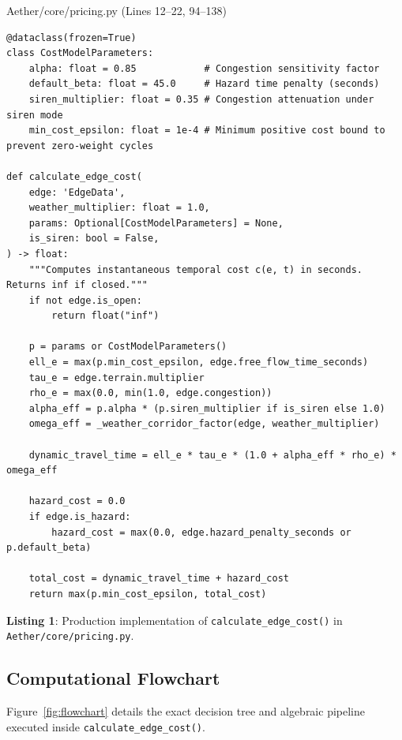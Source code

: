 \documentclass[10pt,a4paper]{article}
\begin{document}
\begin{codebox}{Aether/core/pricing.py (Lines 12--22, 94--138)}
\begin{lstlisting}[style=AetherPython]
@dataclass(frozen=True)
class CostModelParameters:
    alpha: float = 0.85            # Congestion sensitivity factor
    default_beta: float = 45.0     # Hazard time penalty (seconds)
    siren_multiplier: float = 0.35 # Congestion attenuation under siren mode
    min_cost_epsilon: float = 1e-4 # Minimum positive cost bound to prevent zero-weight cycles

def calculate_edge_cost(
    edge: 'EdgeData',
    weather_multiplier: float = 1.0,
    params: Optional[CostModelParameters] = None,
    is_siren: bool = False,
) -> float:
    """Computes instantaneous temporal cost c(e, t) in seconds. Returns inf if closed."""
    if not edge.is_open:
        return float("inf")

    p = params or CostModelParameters()
    ell_e = max(p.min_cost_epsilon, edge.free_flow_time_seconds)
    tau_e = edge.terrain.multiplier
    rho_e = max(0.0, min(1.0, edge.congestion))
    alpha_eff = p.alpha * (p.siren_multiplier if is_siren else 1.0)
    omega_eff = _weather_corridor_factor(edge, weather_multiplier)

    dynamic_travel_time = ell_e * tau_e * (1.0 + alpha_eff * rho_e) * omega_eff

    hazard_cost = 0.0
    if edge.is_hazard:
        hazard_cost = max(0.0, edge.hazard_penalty_seconds or p.default_beta)

    total_cost = dynamic_travel_time + hazard_cost
    return max(p.min_cost_epsilon, total_cost)
\end{lstlisting}
\end{codebox}
\vspace{-3pt}
\begin{center}\sffamily\footnotesize\textbf{Listing 1}: Production implementation of \texttt{calculate\_edge\_cost()} in \texttt{Aether/core/pricing.py}.\end{center}

\subsection{Computational Flowchart}
Figure~\ref{fig:flowchart} details the exact decision tree and algebraic pipeline executed inside \texttt{calculate\_edge\_cost()}.
\end{document}
